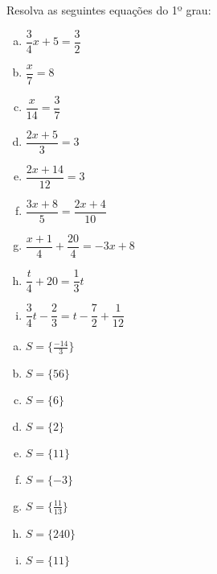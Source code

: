 \begin{secExercicios}

\begin{exer}
Resolva as seguintes equações do 1º grau:
\begin{enumerate}[a)]
\item $\dfrac{3}{4}x + 5= \dfrac{3}{2}$
\item $\dfrac{x}{7}= 8$
\item $\dfrac{x}{14}= \dfrac{3}{7}$
\item $\dfrac{2x+5}{3}= 3$
\item $\dfrac{2x+14}{12}= 3$
\item $\dfrac{3x+8}{5}= \dfrac{2x+4}{10}$
\item $\dfrac{x+1}{4} + \dfrac{20}{4}= -3x + 8$
\item $\dfrac{t}{4} + 20 = \dfrac{1}{3}t$
\item $\dfrac{3}{4}t - \dfrac{2}{3}= t - \dfrac{7}{2} + \dfrac{1}{12}$
\end{enumerate}
\end{exer}
\begin{resp}
\begin{multicols}{3}
 \begin{enumerate}[a)]
 \item $S= \{ \frac{-14}{3} \}$
\item $S= \{ 56 \}$
\item $S= \{ 6 \}$
\item $S= \{ 2 \}$
\item $S= \{ 11 \}$
\item $S= \{ -3 \}$
\item $S= \{ \frac{11}{13} \}$
\item $S= \{ 240 \}$
\item $S= \{ 11 \}$
\end{enumerate}
\end{multicols}
\end{resp}


\end{secExercicios}
